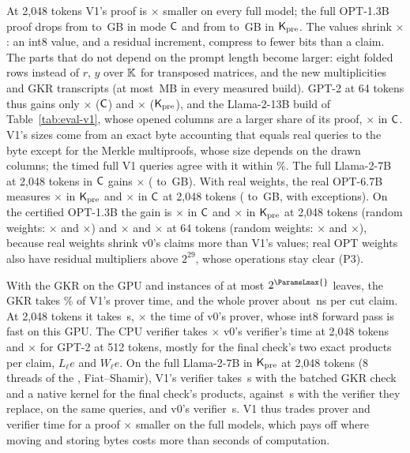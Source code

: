  At 2{,}048 tokens V1's proof is \VOneRatioRandomExact{}$\times$ smaller on every full
model; the full OPT-1.3B proof drops from \VOneOptMCVZeroGB{} to \VOneOptMCVOneGB{}\,GB in mode $\mathsf{C}$ and from \VOneOptMKVZeroGB{} to
\VOneOptMKVOneGB{}\,GB in $\mathsf{K}_{\mathrm{pre}}$. The values shrink \VOneValuesRatio{}$\times$: an int8 value, and a residual increment,
compress to fewer bits than a claim. The parts that do not depend on the prompt length become
larger: eight folded rows instead of $r$, $y$ over $\mathbb{K}$ for transposed matrices,
and the new multiplicities and GKR transcripts (at most \VOneExtrasMax{}\,MB in every measured build). GPT-2 at 64
tokens thus gains only \VOneRatioShortC{}$\times$ ($\mathsf{C}$) and \VOneRatioShortK{}$\times$ ($\mathsf{K}_{\mathrm{pre}}$), and the Llama-2-13B build of
Table~\ref{tab:eval-v1}, whose opened columns are a larger share of its proof, \VOneRatioLargeC{}$\times$ in $\mathsf{C}$.
V1's sizes come from an exact byte accounting that equals real queries to the byte except for the
Merkle multiproofs, whose size depends on the drawn columns; the timed full V1 queries agree with
it within \VOneAccountingWithin{}\%. The full Llama-2-7B at 2{,}048 tokens in $\mathsf{C}$ gains \VOneLlamaCRatio{}$\times$
(\VOneLlamaCVZeroGB{} to \VOneLlamaCVOneGB{}\,GB). With real weights, the real OPT-6.7B measures \VOneRatioRealOptLExact{}$\times$ in $\mathsf{K}_{\mathrm{pre}}$ and \VOneRatioRealOptLCExact{}$\times$ in $\mathsf{C}$
at 2{,}048 tokens (\VOneRealOptLVZeroGB{} to \VOneRealOptLVOneGB{}\,GB, with \VOneRealOptLExceptions{} exceptions). On the certified OPT-1.3B the
gain is \VOneRealOptMLongC{}$\times$ in $\mathsf{C}$ and \VOneRealOptMLongK{}$\times$ in $\mathsf{K}_{\mathrm{pre}}$ at 2{,}048 tokens (random weights:
\VOneRandomOptMLongC{}$\times$ and \VOneRandomOptMLongK{}$\times$) and \VOneRealOptMShortC{}$\times$ and \VOneRealOptMShortK{}$\times$ at 64 tokens
(random weights: \VOneRandomOptMShortC{}$\times$ and \VOneRandomOptMShortK{}$\times$), because real weights shrink v0's claims more than
V1's values; real OPT weights also have residual multipliers
above $2^{29}$, whose operations stay clear (P3).

 With the GKR on the GPU and instances of at most $2^{\ParamsLmax{}}$ leaves, the
GKR takes \VOneProverShare{}\% of V1's prover time, and the whole prover about \VOneNsPerClaim{}\,ns per cut
claim. At 2{,}048 tokens it takes
\VOneProverLong{}\,s, \VOneProverRatioLong{}$\times$ the time of v0's prover, whose int8 forward pass is fast on this
GPU. The CPU verifier takes \VOneVerifyRatioLong{}$\times$ v0's verifier's time at 2{,}048 tokens and
\VOneVerifyRatioMedium{}$\times$ for GPT-2 at 512 tokens, mostly for the final check's two exact products per claim,
$L_\ell e$ and $W_\ell e$. On the full Llama-2-7B in $\mathsf{K}_{\mathrm{pre}}$ at 2{,}048 tokens (8 threads of the
\PlatformCpu{}, Fiat--Shamir), V1's verifier takes \VOneVerifyLlama{}\,s with the batched GKR check and a native kernel for
the final check's products, against \VOneVerifyLlamaBaseline{}\,s with the verifier they replace, on the same
queries, and v0's verifier \VOneVZeroVerifyLlama{}\,s. V1 thus trades prover and verifier time
for a proof \VOneRatioRandom{}$\times$ smaller on the full models, which pays off where moving and storing
bytes costs more than seconds of computation.

